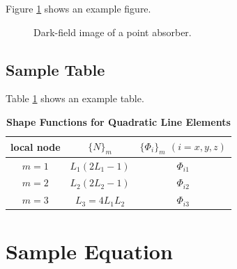 \documentclass[9pt,twocolumn,twoside]{opticajnl}
\begin{document}
Figure \ref{fig:false-color} shows an example figure.

\begin{figure}[ht]
\centering
{}
\caption{Dark-field image of a point absorber.}
\label{fig:false-color}
\end{figure}

\subsection{Sample Table}

Table \ref{tab:shape-functions} shows an example table.

\begin{table}[htbp]
\centering
\caption{\bf Shape Functions for Quadratic Line Elements}
\begin{tabular}{ccc}
\hline
local node & $\{N\}_m$ & $\{\Phi_i\}_m$ $(i=x,y,z)$ \\
\hline
$m = 1$ & $L_1(2L_1-1)$ & $\Phi_{i1}$ \\
$m = 2$ & $L_2(2L_2-1)$ & $\Phi_{i2}$ \\
$m = 3$ & $L_3=4L_1L_2$ & $\Phi_{i3}$ \\
\hline
\end{tabular}
  \label{tab:shape-functions}
\end{table}

\section{Sample Equation}
\end{document}
